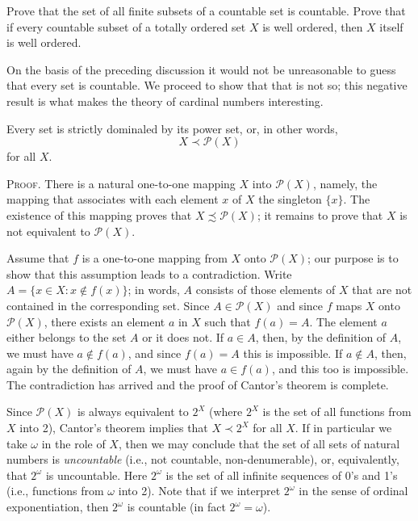 \begin{exercise} Prove that the set of all finite subsets of a countable set is countable. Prove that if every countable subset of a totally ordered set $X$ is well ordered, then $X$ itself is well ordered. 
\end{exercise}

On the basis of the preceding discussion it would not be unreasonable to guess that every set is countable. We proceed to show that that is not so; this negative result is what makes the theory of cardinal numbers interesting.

\newpage

\begin{samepage}
\begin{named} Every set is strictly dominaled by its power set, or, in other words, 
\begin{equation*}
X \prec \mathcal{P}(X)
\end{equation*}
for all $X$. 
\end{named}
\end{samepage}

\textsc{Proof}. There is a natural one-to-one mapping $X$ into $\mathcal{P}(X)$, namely, the mapping that associates with each element $x$ of $X$ the singleton $\{ x \}$. The existence of this mapping proves that $X \precsim \mathcal{P}(X)$; it remains to prove that $X$ is not equivalent to $\mathcal{P}(X)$. 

Assume that $f$ is a one-to-one mapping from $X$ onto $\mathcal{P}(X)$; our purpose is to show that this assumption  leads to a contradiction. Write $A = \{ x \in X: x \notin f(x) \}$; in words, $A$ consists of those elements of $X$ that are not contained in the corresponding set. Since $A \in \mathcal{P}(X)$ and since $f$ maps $X$ onto $\mathcal{P}(X)$, there exists an element $a$ in $X$ such that $f(a) = A$. The element $a$ either belongs to the set $A$ or it does not. If $a \in A$, then, by the definition of $A$, we must have $a \notin f(a)$, and since $f(a) = A$ this is impossible. If $a \notin A$, then, again by the definition of $A$, we must have $a \in f(a)$, and this too is impossible. The contradiction has arrived and the proof of Cantor's theorem is complete.

Since $\mathcal{P}(X)$ is always equivalent to $2^{X}$ (where $2^{X}$ is the set of all functions from $X$ into 2), Cantor's theorem implies that $X \prec 2^{X}$ for all $X$. If in particular we take $\omega$ in the role of $X$, then we may conclude that the set of all sets of natural numbers is \textit{uncountable} (i.e., not countable, non-denumerable), or, equivalently, that $2^{\omega}$ is uncountable. Here $2^{\omega}$ is the set of all infinite sequences of 0's and 1's (i.e., functions from $\omega$ into 2). Note that if we interpret $2^{\omega}$ in the sense of ordinal exponentiation, then $2^{\omega}$ is countable (in fact $2^{\omega} = \omega$).